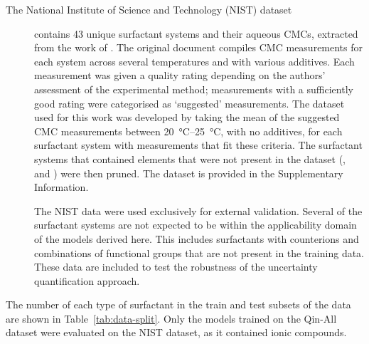 \begin{description}
    \item[The National Institute of Science and Technology (NIST) dataset]
          contains 43 unique surfactant systems and their aqueous CMCs, extracted
          from the work of \citet{mukerjeeCriticalMicelleConcentrations1971}. The
          original document compiles CMC measurements for each system across
          several temperatures and with various additives. Each measurement was
          given a quality rating depending on the authors' assessment of the
          experimental method; measurements with a sufficiently good rating were
          categorised as `suggested' measurements. The dataset used for this work
          was developed by taking the mean of the suggested CMC measurements
          between \SIrange{20}{25}{\degreeCelsius}, with no additives, for
          each surfactant system with measurements that fit these criteria. The
          surfactant systems that contained elements that were not present in the
          dataset (,  and ) were then pruned. The dataset is
          provided in the Supplementary Information.

          The NIST data were used exclusively for external validation. Several
          of the surfactant systems are not expected to be within the
          applicability domain of the models derived here. This includes
          surfactants with counterions and combinations of functional groups
          that are not present in the training data. These data are included to
          test the robustness of the uncertainty quantification approach.
\end{description}

The number of each type of surfactant in the train and test subsets of the data are shown in Table~\ref{tab:data-split}. Only the models trained on the Qin-All dataset were evaluated on the NIST dataset, as it contained ionic compounds.

